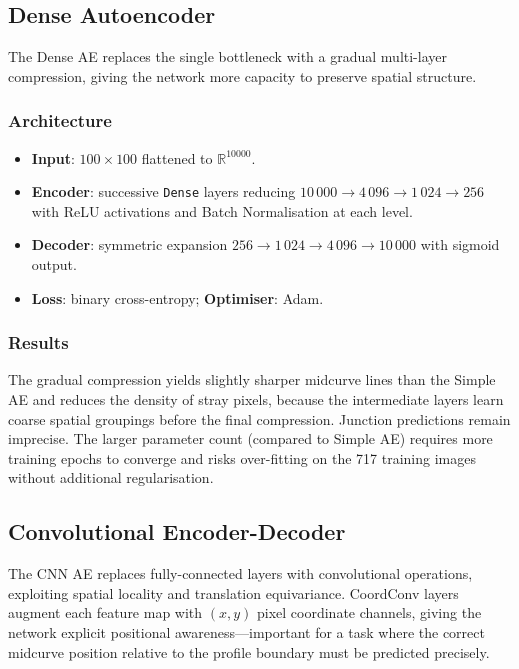 \documentclass[journal]{IEEEtran}
\begin{document}
\subsection{Dense Autoencoder}
\label{sec:dense_ae}

The Dense AE replaces the single bottleneck with a gradual multi-layer
compression, giving the network more capacity to preserve spatial structure.

\subsubsection{Architecture}

\begin{itemize}
  \item \textbf{Input}: $100 \times 100$ flattened to $\mathbb{R}^{10000}$.
  \item \textbf{Encoder}: successive \texttt{Dense} layers reducing
        $10\,000 \to 4\,096 \to 1\,024 \to 256$ with ReLU activations and
        Batch Normalisation at each level.
  \item \textbf{Decoder}: symmetric expansion
        $256 \to 1\,024 \to 4\,096 \to 10\,000$ with sigmoid output.
  \item \textbf{Loss}: binary cross-entropy; \textbf{Optimiser}: Adam.
\end{itemize}

\subsubsection{Results}

The gradual compression yields slightly sharper midcurve lines than the Simple
AE and reduces the density of stray pixels, because the intermediate layers
learn coarse spatial groupings before the final compression.  Junction
predictions remain imprecise.  The larger parameter count (compared to Simple
AE) requires more training epochs to converge and risks over-fitting on the
717 training images without additional regularisation.

\subsection{Convolutional Encoder-Decoder}
\label{sec:cnn_ae}

The CNN AE replaces fully-connected layers with convolutional operations,
exploiting spatial locality and translation equivariance.  CoordConv
\cite{liu2018coordconv} layers augment each feature map with $(x, y)$ pixel
coordinate channels, giving the network explicit positional awareness—important
for a task where the correct midcurve position relative to the profile boundary
must be predicted precisely.
\end{document}
